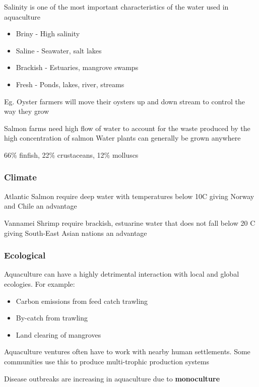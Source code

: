 			Salinity is one of the most important characteristics of the water used in aquaculture
			\begin{itemize}
				\item Briny - High salinity
				\item Saline - Seawater, salt lakes
				\item Brackish - Estuaries, mangrove swamps
				\item Fresh - Ponds, lakes, river, streams
			\end{itemize}
		
			Eg. Oyster farmers will move their oysters up and down stream to control the way they grow

			Salmon farms need high flow of water to account for the waste produced by the high concentration of salmon
			Water plants can generally be grown anywhere

			66\% finfish, 22\% crustaceans, 12\% molluscs
			
		\subsubsection{Climate}
			Atlantic Salmon require deep water with temperatures below 10\textdegree C giving Norway and Chile an advantage

			Vannamei Shrimp require brackish, estuarine water that does not fall below 20 \textdegree C giving South-East Asian nations an advantage

		\subsubsection{Ecological}
			Aquaculture can have a highly detrimental interaction with local and global ecologies. For example:
			\begin{itemize}
				\item Carbon emissions from feed catch trawling
				\item By-catch from trawling
				\item Land clearing of mangroves
			\end{itemize}

			Aquaculture ventures often have to work with nearby human settlements. Some communities use this to produce multi-trophic production systems

			Disease outbreaks are increasing in aquaculture due to \textbf{monoculture}

